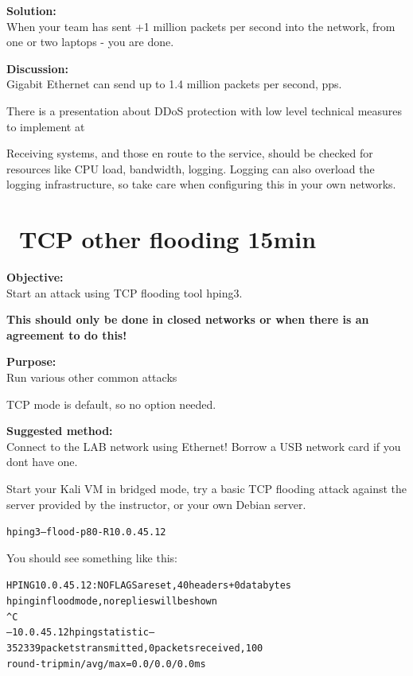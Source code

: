 \documentclass[a4paper,11pt,notitlepage]{report}
\begin{document}
{\bf Solution:}\\
When your team has sent +1 million packets per second into the network, from one or two laptops - you are done.

{\bf Discussion:}\\
Gigabit Ethernet can send up to 1.4 million packets per second, pps.

There is a presentation about DDoS protection with low level technical measures to implement at\\
{\footnotesize {}}

Receiving systems, and those en route to the service, should be checked for resources like CPU load, bandwidth, logging. Logging can also overload the logging infrastructure, so take care when configuring this in your own networks.


\chapter{\faInfoCircle\ TCP other flooding 15min}


{\bf Objective:}\\
Start an attack using TCP flooding tool hping3.

{\color{red} \bf This should only be done in closed networks or when there is an agreement to do this!}

{\bf Purpose:}\\
Run various other common attacks

TCP mode is default, so no option needed.


{\bf Suggested method:}\\
Connect to the LAB network using Ethernet! Borrow a USB network card if you dont have one.

Start your Kali VM in bridged mode, try a basic TCP flooding attack against the server provided by the instructor, or your own Debian server.

\begin{alltt}
hping3 --flood -p 80 -R 10.0.45.12
\end{alltt}

You should see something like this:
\begin{alltt}\footnotesize
HPING 10.0.45.12: NO FLAGS are set, 40 headers + 0 data bytes
hping in flood mode, no replies will be shown
^C
--- 10.0.45.12 hping statistic ---
352339 packets transmitted, 0 packets received, 100%
round-trip min/avg/max = 0.0/0.0/0.0 ms
\end{alltt}
\end{document}

